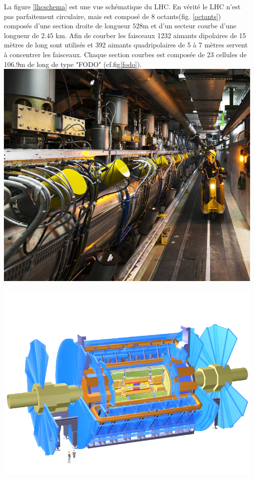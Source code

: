 La figure \ref{lhcschema} est une vue schématique du LHC. En vérité le LHC n'est pas parfaitement circulaire, mais est composé de $8$ octants(fig. \ref{octants}) composés d'une section droite de longueur $528$m et d'un secteur courbe d'une longueur de $2.45$ km. Afin de courber les faisceaux 1232 aimants dipolaires de 15 mètres de long sont utilisés et 392 aimants quadripolaires de 5 à 7 mètres servent à concentrer les faisceaux. Chaque section courbes est composée de 23 cellules de 106.9m de long de type "FODO" (cf.fig\ref{fodo}).
\marginpar
{
	\includegraphics[width=\marginparwidth]{LHC/RF.jpg}
	\label{atlas}
}

\marginpar
{
	\includegraphics[width=\marginparwidth]{LHC/atlas.png}
	\label{atlas}
}

